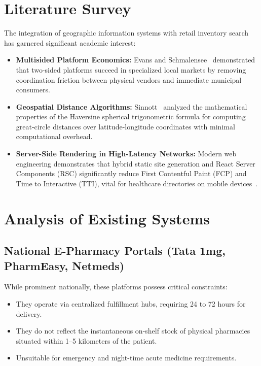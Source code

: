\documentclass[12pt,a4paper]{report}
\begin{document}
\section{Literature Survey}
The integration of geographic information systems with retail inventory search has garnered significant academic interest:
\begin{itemize}
    \item \textbf{Multisided Platform Economics:} Evans and Schmalensee~\cite{evans2016matchmakers} demonstrated that two-sided platforms succeed in specialized local markets by removing coordination friction between physical vendors and immediate municipal consumers.
    \item \textbf{Geospatial Distance Algorithms:} Sinnott~\cite{sinnott1984virtues} analyzed the mathematical properties of the Haversine spherical trigonometric formula for computing great-circle distances over latitude-longitude coordinates with minimal computational overhead.
    \item \textbf{Server-Side Rendering in High-Latency Networks:} Modern web engineering demonstrates that hybrid static site generation and React Server Components (RSC) significantly reduce First Contentful Paint (FCP) and Time to Interactive (TTI), vital for healthcare directories on mobile devices~\cite{nextjs2024}.
\end{itemize}

\section{Analysis of Existing Systems}

\subsection{National E-Pharmacy Portals (Tata 1mg, PharmEasy, Netmeds)}
While prominent nationally, these platforms possess critical constraints:
\begin{itemize}
    \item They operate via centralized fulfillment hubs, requiring 24 to 72 hours for delivery.
    \item They do not reflect the instantaneous on-shelf stock of physical pharmacies situated within 1--5 kilometers of the patient.
    \item Unsuitable for emergency and night-time acute medicine requirements.
\end{itemize}
\end{document}
